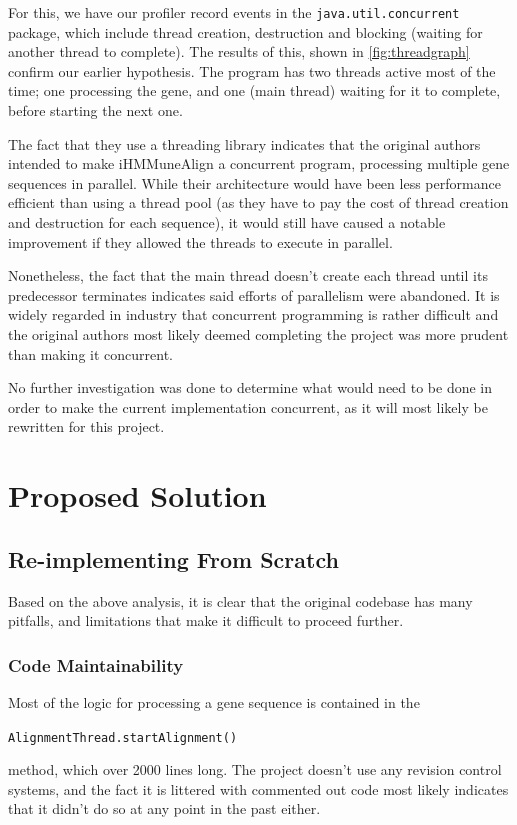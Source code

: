 For this, we have our profiler record events in the \texttt{java.util.concurrent} package, which include thread creation, destruction and blocking (waiting for another thread to complete). The results of this, shown in \autoref{fig:threadgraph} confirm our earlier hypothesis. The program has two threads active most of the time; one processing the gene, and one (main thread) waiting for it to complete, before starting the next one.

The fact that they use a threading library indicates that the original authors intended to make iHMMuneAlign a concurrent program, processing multiple gene sequences in parallel. While their architecture would have been less performance efficient than using a thread pool (as they have to pay the cost of thread creation and destruction for each sequence), it would still have caused a notable improvement if they allowed the threads to execute in parallel.

Nonetheless, the fact that the main thread doesn't create each thread until its predecessor terminates indicates said efforts of parallelism were abandoned. It is widely regarded in industry that concurrent programming is rather difficult and the original authors most likely deemed completing the project was more prudent than making it concurrent.

No further investigation was done to determine what would need to be done in order to make the current implementation concurrent, as it will most likely be rewritten for this project.

\chapter{Proposed Solution}

\section{Re-implementing From Scratch}

Based on the above analysis, it is clear that the original codebase has many pitfalls, and limitations that make it difficult to proceed further.

\subsection{Code Maintainability}
Most of the logic for processing a gene sequence is contained in the \begin{center}
  \texttt{AlignmentThread.startAlignment()}
\end{center}
method, which over 2000 lines long. The project doesn't use any revision control systems, and the fact it is littered with commented out code most likely indicates that it didn't do so at any point in the past either.

